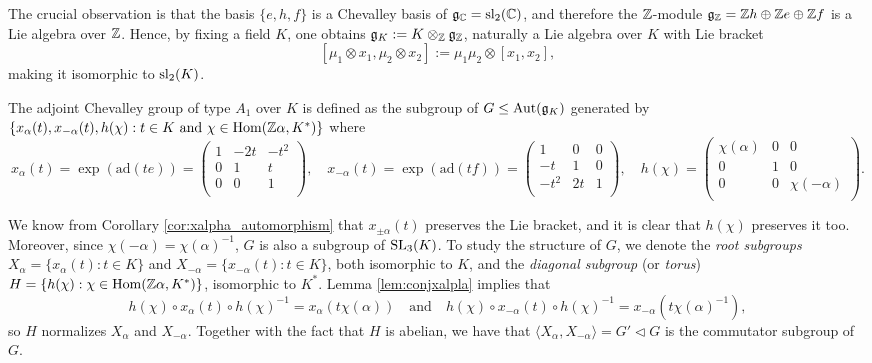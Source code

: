 The crucial observation is that the basis $\{e,h,f\}$ is a Chevalley basis of $\mathfrak{g}_{\mathbb{C}}=\mathrm{sl}_2(\mathbb{C})$, and therefore the $\mathbb{Z}$-module $\mathfrak{g}_{\mathbb{Z}}=\mathbb{Z} h\oplus\mathbb{Z} e\oplus\mathbb{Z} f$ is a Lie algebra over $\mathbb{Z}$. Hence, by fixing a field $K$, one obtains $\mathfrak{g}_K:=K\otimes_{\mathbb{Z}}\mathfrak{g}_{\mathbb{Z}}$, naturally a Lie algebra over $K$ with Lie bracket
$$[\mu_1\otimes x_1,\mu_2\otimes x_2]:=\mu_1\mu_2\otimes[x_1,x_2],$$
making it isomorphic to $\mathrm{sl}_2(K)$.

The adjoint Chevalley group of type $A_1$ over $K$ is defined as the subgroup of $G\leq\mathrm{Aut}(\mathfrak{g}_K)$ generated by $\{x_\alpha(t),x_{-\alpha}(t),h(\chi):t\in K\text{ and }\chi\in\mathrm{Hom}(\mathbb{Z}\alpha,K^*)\}$ where
$$x_\alpha(t)=\exp(\mathrm{ad}(te))=\begin{pmatrix}
    1 & -2t & -t^2\\
    0 & 1 & t\\
    0 & 0 & 1\\
\end{pmatrix},\quad x_{-\alpha}(t)=\exp(\mathrm{ad}(tf))=\begin{pmatrix}
    1 & 0 & 0\\
    -t & 1 & 0\\
    -t^2 & 2t & 1\\
\end{pmatrix},\quad h(\chi)=\begin{pmatrix}
    \chi(\alpha) & 0 & 0\\
    0 & 1 & 0\\
    0 & 0 & \chi(-\alpha)\\
\end{pmatrix}.$$

We know from Corollary \ref{cor:xalpha_automorphism} that $x_{\pm\alpha}(t)$ preserves the Lie bracket, and it is clear that $h(\chi)$ preserves it too. Moreover, since $\chi(-\alpha)=\chi(\alpha)^{-1}$, $G$ is also a subgroup of $\mathrm{SL}_3(K)$. To study the structure of $G$, we denote the \textit{root subgroups} $X_\alpha=\{x_\alpha(t):t\in K\}$ and $X_{-\alpha}=\{x_{-\alpha}(t):t\in K\}$, both isomorphic to $K$, and the \textit{diagonal subgroup} (or \textit{torus}) $H=\{h(\chi):\chi\in\mathrm{Hom}(\mathbb{Z}\alpha,K^*)\}$, isomorphic to $K^*$. Lemma \ref{lem:conjxalpla} implies that 
$$h(\chi)\circ x_\alpha(t)\circ h(\chi)^{-1}=x_\alpha(t\chi(\alpha))\quad\text{and}\quad h(\chi)\circ x_{-\alpha}(t)\circ h(\chi)^{-1}=x_{-\alpha}(t\chi(\alpha)^{-1}),$$ so $H$ normalizes $X_\alpha$ and $X_{-\alpha}$. Together with the fact that $H$ is abelian, we have that $\langle X_\alpha,X_{-\alpha}\rangle=G'\triangleleft G$ is the commutator subgroup of $G$. 

